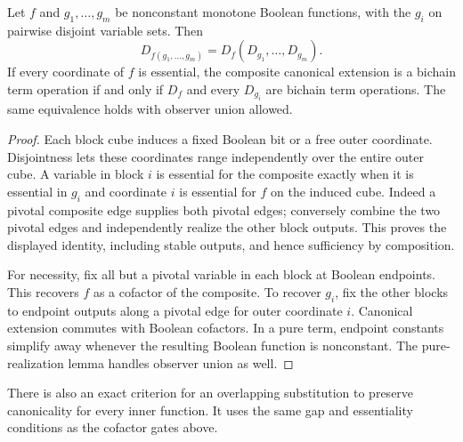 \begin{proposition}
\label{core:prop:essential-disjoint-substitution}
Let $f$ and $g_1,\ldots,g_m$ be nonconstant monotone Boolean functions,
with the $g_i$ on pairwise disjoint variable sets. Then
\[
 D_{f(g_1,\ldots,g_m)}=D_f(D_{g_1},\ldots,D_{g_m}).
\]
If every coordinate of $f$ is essential, the composite canonical
extension is a bichain term operation if and only if $D_f$ and every
$D_{g_i}$ are bichain term operations. The same equivalence holds
with observer union allowed.
\end{proposition}
\begin{proof}
Each block cube induces a fixed Boolean bit or a free outer coordinate.
Disjointness lets these coordinates range independently over the entire
outer cube. A variable in block $i$ is essential for the composite
exactly when it is essential in $g_i$ and coordinate $i$ is essential
for $f$ on the induced cube. Indeed a pivotal composite edge supplies
both pivotal edges; conversely combine the two pivotal edges and
independently realize the other block outputs. This proves the displayed
identity, including stable outputs, and hence sufficiency by composition.

For necessity, fix all but a pivotal variable in each block at Boolean
endpoints. This recovers $f$ as a cofactor of the composite. To recover
$g_i$, fix the other blocks to endpoint outputs along a pivotal edge
for outer coordinate $i$. Canonical extension commutes with Boolean
cofactors. In a pure term, endpoint constants simplify away whenever
the resulting Boolean function is nonconstant. The pure-realization
lemma handles observer union as well.
\end{proof}

There is also an exact criterion for an overlapping substitution to
preserve canonicality for every inner function. It uses the same gap and
essentiality conditions as the cofactor gates above.

